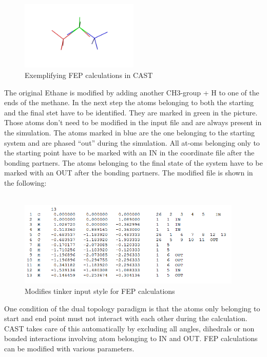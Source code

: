 \documentclass[10pt,a4paper]{article} %
\begin{document}
{	\begin{figure}[h]
		\centering
		\includegraphics[width=0.5\textwidth]{img/imgfep1.png}
		\caption{Exemplifying FEP calculations in CAST}
		\label{fig:FEP1}
	\end{figure}
	The original Ethane is modified by adding another CH3-group + H to one of the ends of the methane. In the next step the atoms belonging to both the starting and the final stet have to be identified. They are marked in green in the picture. Those atoms don’t need to be modified in the input file and are always present in the simulation. The atoms marked in blue are the one belonging to the starting system and are phased “out” during the simulation. All at-oms belonging only to the starting point have to be marked with an IN in the coordinate file after the bonding partners. The atoms belonging to the final state of the system have to be marked with an OUT after the bonding partners. The modified file is shown in the following:\\~\\
	\begin{figure}[h]
		\centering
		\includegraphics[width=0.95\textwidth]{img/imgfep2.png}
		\caption{Modifies tinker input style for FEP calculations}
		\label{fig:FEP2}
	\end{figure}
	One condition of the dual topology paradigm is that the atoms only belonging to start and end point must not interact with each other during the calculation. CAST takes care of this automatically by excluding all angles, dihedrals or non bonded interactions involving atom belonging to IN and OUT.
	FEP calculations can be modified with various parameters.

}
\end{document}
